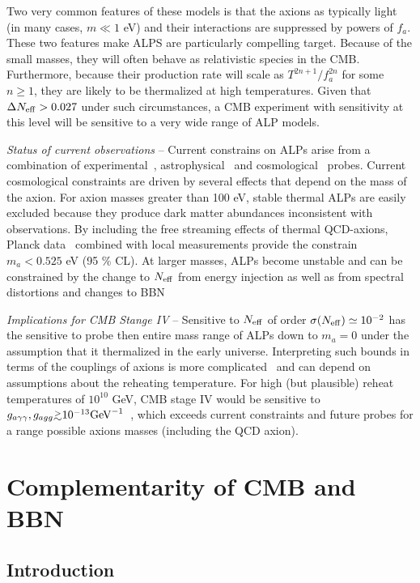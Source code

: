 Two very common features of these models is that the axions as typically light (in many cases, $m \ll 1$ eV) and their interactions are suppressed by powers of $f_a$.  These two features make ALPS are particularly compelling target.  Because of the small masses, they will often behave as relativistic species in the CMB.  Furthermore, because their production rate will scale as $T^{2n +1} / f_a^{2n}$ for some $n \geq 1$, they are likely to be thermalized at high temperatures.  Given that $\Delta N_{\rm eff} > 0.027$ under such circumstances, a CMB experiment with sensitivity at this level will be sensitive to a very wide range of ALP models.

{\it Status of current observations} -- Current constrains on ALPs arise from a combination of experimental~\cite{Graham:2015ouw}, astrophysical~\cite{Raffelt:2012kt} and cosmological~\cite{Marsh:2015xka} probes.  Current cosmological constraints are driven by several effects that depend on the mass of the axion.  For axion masses greater than 100 eV, stable thermal ALPs are easily excluded because they produce dark matter abundances inconsistent with observations.  By including the free streaming effects of thermal QCD-axions,  Planck data~\cite{DiValentino:2015wba} combined with local measurements provide the constrain $m_a < 0.525$ eV (95 \% CL).  At larger masses, ALPs become unstable and can be constrained by the change to $N_{\rm eff}$ from energy injection as well as from spectral distortions and changes to BBN~\cite{Cadamuro:2011fd,Follin:2015hya}

{\it Implications for CMB Stange IV} -- Sensitive to $N_{\rm eff}$ of order $\sigma(N_{\rm eff}) \simeq 10^{-2}$ has the sensitive to probe then entire mass range of ALPs down to $m_a =0$ under the assumption that it thermalized in the early universe.  Interpreting such bounds in terms of the couplings of axions is more complicated~\cite{Brust:2013xpv} and can depend on assumptions about the reheating temperature.  For high (but plausible) reheat temperatures of $10^{10}$ GeV, CMB stage IV would be sensitive to $g_{a\gamma \gamma}, g_{a g g} \gtrsim 10^{-13} {\rm GeV}^{-1}$~\cite{}, which exceeds current constraints and future probes for a range possible axions masses (including the QCD axion).  

\section{Complementarity of CMB and BBN}

\subsection{Introduction} \label{Introduction}

